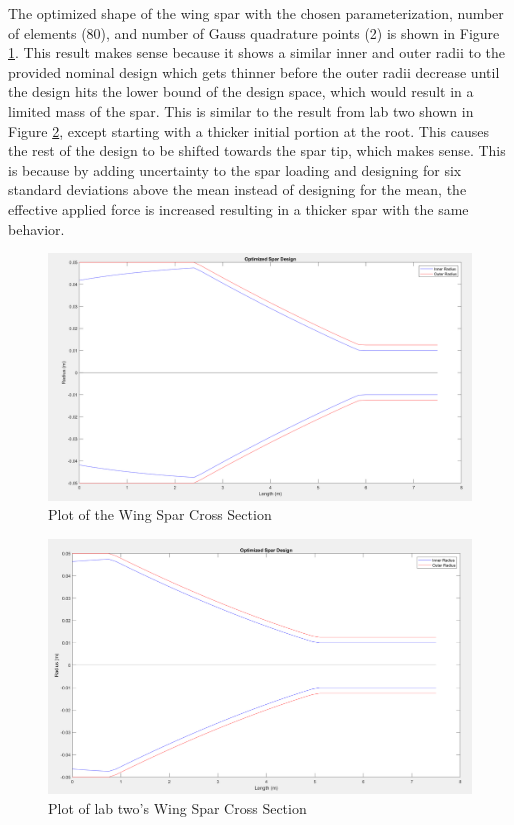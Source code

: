 \documentclass[11pt]{article}%
\begin{document}
The optimized shape of the wing spar with the chosen parameterization, number of elements (80)\cite{lab2}, and number of Gauss quadrature points (2) is shown in Figure \ref{fig:cross}. This result makes sense because it shows a similar inner and outer radii to the provided nominal design which gets thinner before the outer radii decrease until the design hits the lower bound of the design space, which would result in a limited mass of the spar. This is similar to the result from lab two shown in Figure \ref{fig:crossold}, except starting with a thicker initial portion at the root. This causes the rest of the design to be shifted towards the spar tip, which makes sense. This is because by adding uncertainty to the spar loading and designing for six standard deviations above the mean instead of designing for the mean, the effective applied force is increased resulting in a thicker spar with the same behavior.

\begin{figure}[h!]
    \centering
    \includegraphics[width=0.75\linewidth]{fminconoutput.png}
    \caption{ Plot of the Wing Spar Cross Section }
    \label{fig:cross}
\end{figure}

\begin{figure}[h!]
    \centering
    \includegraphics[width=0.75\linewidth]{fmiconoutput.png}
    \caption{ Plot of lab two's Wing Spar Cross Section }
    \label{fig:crossold}
\end{figure}
\end{document}
